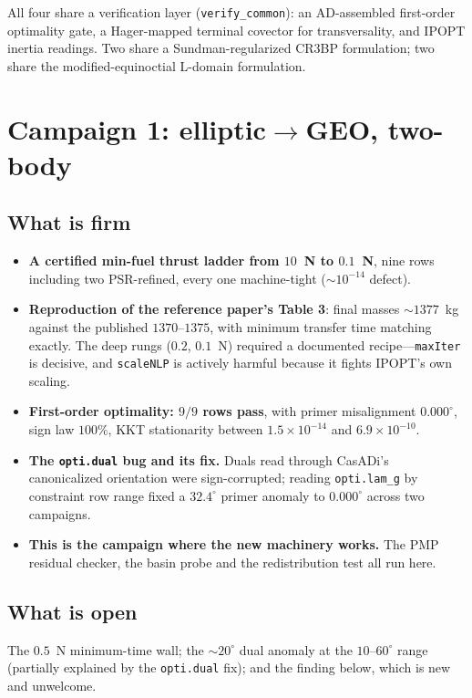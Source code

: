 \documentclass[11pt]{article}
\newcommand{\camp}[1]{\texttt{#1}}
\begin{document}
All four share a verification layer (\camp{verify\_common}): an AD-assembled
first-order optimality gate, a Hager-mapped terminal covector for
transversality, and IPOPT inertia readings. Two share a Sundman-regularized
CR3BP formulation; two share the modified-equinoctial L-domain formulation.

\section{Campaign 1: elliptic$\to$GEO, two-body}

\subsection{What is firm}

\begin{itemize}
  \item \textbf{A certified min-fuel thrust ladder from $10$~N to $0.1$~N},
  nine rows including two PSR-refined, every one machine-tight
  ($\sim10^{-14}$ defect).
  \item \textbf{Reproduction of the reference paper's Table 3}: final masses
  $\sim\!1377$~kg against the published $1370$--$1375$, with minimum transfer
  time matching exactly. The deep rungs ($0.2$, $0.1$~N) required a documented
  recipe---\camp{maxIter} is decisive, and \camp{scaleNLP} is actively harmful
  because it fights IPOPT's own scaling.
  \item \textbf{First-order optimality: $9/9$ rows pass}, with primer
  misalignment $0.000^\circ$, sign law $100\%$, KKT stationarity between
  $1.5\times10^{-14}$ and $6.9\times10^{-10}$.
  \item \textbf{The \camp{opti.dual} bug and its fix.} Duals read through
  CasADi's canonicalized orientation were sign-corrupted; reading
  \camp{opti.lam\_g} by constraint row range fixed a $32.4^\circ$ primer
  anomaly to $0.000^\circ$ across two campaigns.
  \item \textbf{This is the campaign where the new machinery works.} The PMP
  residual checker, the basin probe and the redistribution test all run here.
\end{itemize}

\subsection{What is open}

The $0.5$~N minimum-time wall; the $\sim\!20^\circ$ dual anomaly at the
$10$--$60^\circ$ range (partially explained by the \camp{opti.dual} fix); and
the finding below, which is new and unwelcome.
\end{document}
